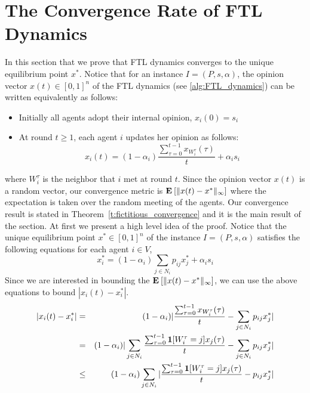 \section{The Convergence Rate of FTL Dynamics}\label{s:fictitious_convergence}
In this section that we prove that FTL dynamics
converges to the unique equilibrium point $x^*$.
Notice that for an instance $I=(P,s,\alpha)$, the opinion vector $x(t) \in [0,1]^n$
of the FTL dynamics (see \ref{alg:FTL_dynamics}) can be written equivalently as follows:
\begin{itemize}
 \item Initially all agents adopt their internal opinion, $x_i(0)=s_i$
 \item At round $t \geq 1$, each agent $i$ updates her opinion as follows:
 \begin{equation}
x_i(t)=(1-\alpha_i)\frac{\sum_{\tau=0}^{t-1} x_{W_i^\tau}(\tau)}{t}+ \alpha_i s_i\end{equation}
\end{itemize}
where $W_i^\tau$ is the neighbor that $i$ met at round $t$.
Since the opinion vector $x(t)$ is a random vector,
our convergence metric is $\bm{\mathrm{E}}_{} \left[ \| x(t) - x^* \|_{\infty} \right]$
where the expectation is taken over the random meeting of the agents.
Our convergence result is stated in Theorem~\ref{t:fictitious_convergence}
and it is the main result of the section.
%
%
\noindent At first we present a high level idea of the proof.
Notice that the unique equilibrium point $x^* \in [0,1]^n$ of the
instance $I=(P,s,\alpha)$ satisfies the following equations
for each agent $i \in V$,
\[x_i^*= (1-\alpha_i)\sum_{j \in N_i}p_{ij}x_j^* + \alpha_is_i\]
Since we are interested in bounding the $\bm{\mathrm{E}}_{} \left[ \| x(t)-x^* \|_{\infty} \right]$, we
can use the above equations to bound $|x_i(t)-x_i^*|$.
\begin{eqnarray*}
 |x_i(t)-x_i^*|
 &=& (1-\alpha_i)|\frac{\sum_{\tau=0}^{t-1} x_{W_i^\tau}(\tau)}{t}
 - \sum_{j \in N_i} p_{ij}x_j^*|\\
 &=& (1-\alpha_i)|\sum_{j \in N_i}\frac{\sum_{\tau=0}^{t-1} \bm{1}{\left[W_i^\tau=j\right]}x_j(\tau)}{t}-\sum_{j \in N_i} p_{ij}x_j^*|\\
 &\leq& (1-\alpha_i)\sum_{j \in N_i}|\frac{\sum_{\tau=0}^{t-1} \bm{1}{\left[W_i^\tau=j\right]}x_j(\tau)}{t}- p_{ij}x_j^*|
\end{eqnarray*}
